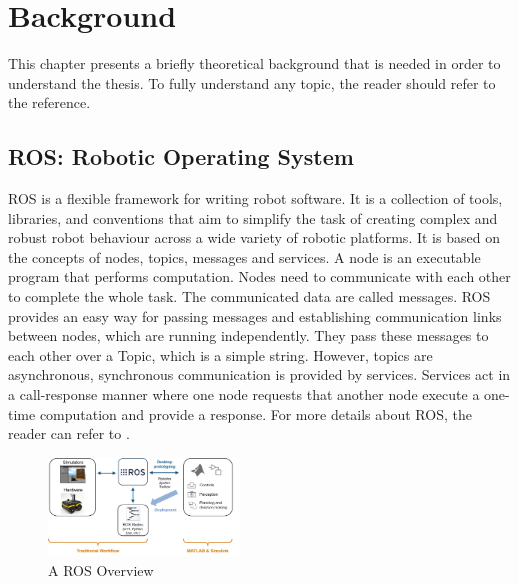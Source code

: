 \chapter{Background}


This chapter presents a briefly theoretical background that is needed in order to understand the thesis. To fully understand any topic, the reader should refer to the reference.


\section{ROS: Robotic Operating System}

ROS is a flexible framework for writing robot software. It is a collection of tools, libraries, and conventions that aim to simplify the task of creating complex and robust robot behaviour across a wide variety of robotic platforms. It is based on the concepts of nodes, topics, messages and services. A node is an executable program that performs computation. Nodes need to communicate with each other to complete the whole task. The communicated data are called messages. ROS provides an easy way for passing messages and establishing communication links between nodes, which are running independently. They pass these messages to each other over a Topic, which is a simple string. However, topics are asynchronous, synchronous communication is provided by services. Services act in a call-response manner where one node requests that another node execute a one-time computation and provide a response. For more details about ROS, the reader can refer to \cite{ros}.

\begin{figure}[!h]
\begin{center}
\includegraphics[width=2in]{figures02/ros_workflows}
\caption{A ROS Overview}%
\end{center}
\end{figure}
